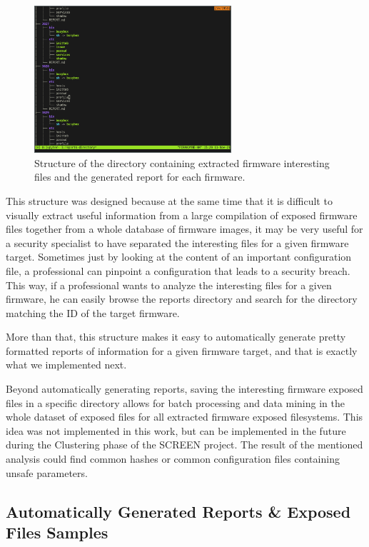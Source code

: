 \begin{figure}[H]
    \centering
    \includegraphics[width=0.65\textwidth]{figs/tree.png}
    \caption{Structure of the directory containing extracted firmware interesting files and the generated report for each firmware.}
    \label{fig:reports-directory}
\end{figure}

This structure was designed because at the same time that it is difficult to visually extract useful information from a large compilation of exposed firmware files together from a whole database of firmware images, it may be very useful for a security specialist to have separated the interesting files for a given firmware target. Sometimes just by looking at the content of an important configuration file, a professional can pinpoint a configuration that leads to a security breach. This way, if a professional wants to analyze the interesting files for a given firmware, he can easily browse the reports directory and search for the directory matching the ID of the target firmware.

More than that, this structure makes it easy to automatically generate pretty formatted reports of information for a given firmware target, and that is exactly what we implemented next.

Beyond automatically generating reports, saving the interesting firmware exposed files in a specific directory allows for batch processing and data mining in the whole dataset of exposed files for all extracted firmware exposed filesystems. This idea was not implemented in this work, but can be implemented in the future during the Clustering phase of the SCREEN project. The result of the mentioned analysis could find common hashes or common configuration files containing unsafe parameters.

\subsection{Automatically Generated Reports \& Exposed Files Samples}
\label{sec:auto-reports}


